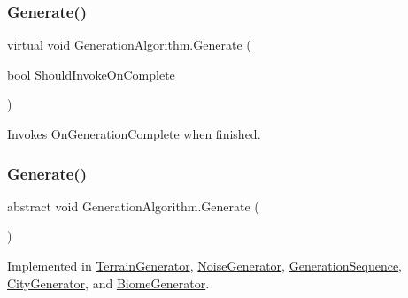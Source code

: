 \mbox{\label{class_generation_algorithm_a9c0cc2cf748d7320651aa8d48d81c407}} 
\subsubsection{\texorpdfstring{Generate()}{Generate()}\hspace{0.1cm}{\footnotesize\ttfamily [1/2]}}
{\footnotesize\ttfamily virtual void Generation\+Algorithm.\+Generate (\begin{DoxyParamCaption}\item[{bool}]{Should\+Invoke\+On\+Complete }\end{DoxyParamCaption})\hspace{0.3cm}{\ttfamily [virtual]}}



Invokes On\+Generation\+Complete when finished. 

\mbox{\label{class_generation_algorithm_ac2df20f7751c1b480ab958791d5c7d41}} 
\subsubsection{\texorpdfstring{Generate()}{Generate()}\hspace{0.1cm}{\footnotesize\ttfamily [2/2]}}
{\footnotesize\ttfamily abstract void Generation\+Algorithm.\+Generate (\begin{DoxyParamCaption}{ }\end{DoxyParamCaption})\hspace{0.3cm}{\ttfamily [pure virtual]}}



Implemented in \mbox{\hyperlink{class_terrain_generator_ace92d2a3406204b124c51e91f68a0aec}{Terrain\+Generator}}, \mbox{\hyperlink{class_noise_generator_af97b78b12d39a0ae2d05e1d28c970005}{Noise\+Generator}}, \mbox{\hyperlink{class_generation_sequence_ac594b809365f2af5e423bfd5830b796a}{Generation\+Sequence}}, \mbox{\hyperlink{class_city_generator_aa80ad8d8d723fd17f6bf9a4fe89dec4f}{City\+Generator}}, and \mbox{\hyperlink{class_biome_generator_ac8ac31b6e0276662994f0cd143457fdb}{Biome\+Generator}}.

